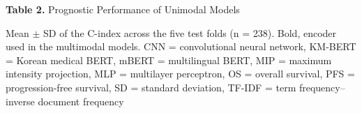 \documentclass[border=8pt]{standalone}
\newif\ifshowtitle \showtitletrue
\newif\ifshownotes \shownotestrue
\begin{document}
\sbox{}%
\begin{minipage}{\wd\tablebox}
\ifshowtitle\noindent \textbf{Table 2.} Prognostic Performance of Unimodal Models\par\vspace{4pt}\fi
\noindent\usebox\tablebox
\ifshownotes\par\vspace{3pt}\footnotesize\noindent Mean $\pm$ SD of the C-index across the five test folds (n = 238). Bold, encoder used in the multimodal models. CNN = convolutional neural network, KM-BERT = Korean medical BERT, mBERT = multilingual BERT, MIP = maximum intensity projection, MLP = multilayer perceptron, OS = overall survival, PFS = progression-free survival, SD = standard deviation, TF-IDF = term frequency--inverse document frequency\par\fi
\end{minipage}
\end{document}
